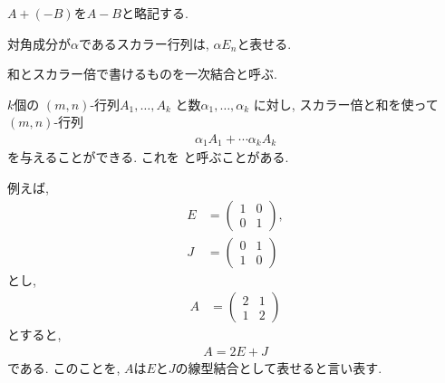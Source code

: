 \begin{definition}
  $A+(-B)$を$A-B$と略記する.
\end{definition}

\begin{remark}
  対角成分が$\alpha$であるスカラー行列は, $\alpha E_n$と表せる.
\end{remark}

和とスカラー倍で書けるものを一次結合と呼ぶ.
\begin{definition}
  $k$個の
  $(m,n)$-行列$A_1,\ldots,A_k$
  と数$\alpha_1,\ldots,\alpha_k$
  に対し, スカラー倍と和を使って
  $(m,n)$-行列
  \begin{align*}
    \alpha_1A_1 + \cdots \alpha_kA_k
  \end{align*}
  を与えることができる.
  これを
 と呼ぶことがある.
\end{definition}
\begin{example}
  例えば,
  \begin{align*}
    E&=\begin{pmatrix}1&0\\0&1\end{pmatrix},\\
    J&=\begin{pmatrix}0&1\\1&0\end{pmatrix}
  \end{align*}
  とし,
  \begin{align*}
    A&=\begin{pmatrix}2&1\\1&2\end{pmatrix}
  \end{align*}
  とすると,
  \begin{align*}
    A=2E+J
  \end{align*}
  である.
  このことを,
  $A$は$E$と$J$の線型結合として表せると言い表す.
\end{example}

